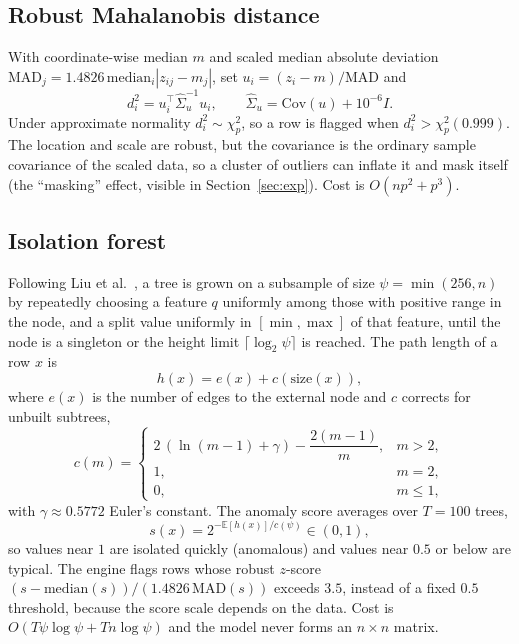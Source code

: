 \documentclass[conference]{IEEEtran}
\begin{document}
\subsection{Robust Mahalanobis distance}
With coordinate-wise median $m$ and scaled median absolute deviation $\mathrm{MAD}_j=1.4826\,\mathrm{median}_i|z_{ij}-m_j|$, set $u_i=(z_i-m)/\mathrm{MAD}$ and
\begin{equation}d_i^2=u_i^\top\hat\Sigma_u^{-1}u_i,\qquad \hat\Sigma_u=\mathrm{Cov}(u)+10^{-6}I.\end{equation}
Under approximate normality $d_i^2\sim\chi^2_p$, so a row is flagged when $d_i^2>\chi^2_{p}(0.999)$. The location and scale are robust, but the covariance is the ordinary sample covariance of the scaled data, so a cluster of outliers can inflate it and mask itself (the ``masking'' effect, visible in Section~\ref{sec:exp}). Cost is $O(np^2+p^3)$.

\subsection{Isolation forest}
Following Liu et al.\ \cite{liu2008}, a tree is grown on a subsample of size $\psi=\min(256,n)$ by repeatedly choosing a feature $q$ uniformly among those with positive range in the node, and a split value uniformly in $[\min,\max]$ of that feature, until the node is a singleton or the height limit $\lceil\log_2\psi\rceil$ is reached. The path length of a row $x$ is
\begin{equation}h(x)=e(x)+c(\mathrm{size}(x)),\end{equation}
where $e(x)$ is the number of edges to the external node and $c$ corrects for unbuilt subtrees,
\begin{equation}c(m)=\begin{cases}2\,(\ln(m-1)+\gamma)-\dfrac{2(m-1)}{m},&m>2,\\1,&m=2,\\0,&m\le1,\end{cases}\end{equation}
with $\gamma\approx0.5772$ Euler's constant. The anomaly score averages over $T=100$ trees,
\begin{equation}s(x)=2^{-\mathbb E[h(x)]/c(\psi)}\in(0,1),\end{equation}
so values near $1$ are isolated quickly (anomalous) and values near $0.5$ or below are typical. The engine flags rows whose robust $z$-score $(s-\mathrm{median}(s))/(1.4826\,\mathrm{MAD}(s))$ exceeds $3.5$, instead of a fixed $0.5$ threshold, because the score scale depends on the data. Cost is $O(T\psi\log\psi+Tn\log\psi)$ and the model never forms an $n\times n$ matrix.
\end{document}

